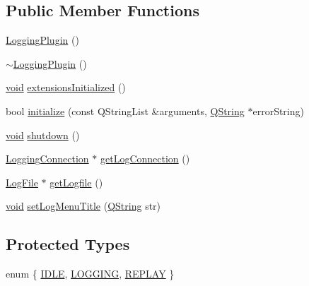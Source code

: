 \subsection*{\-Public \-Member \-Functions}
\begin{DoxyCompactItemize}
\item 
\hyperlink{group___logging_gaddeb416da42e01f34abe18fa2fa39400}{\-Logging\-Plugin} ()
\item 
\hyperlink{group___logging_gaea5e4f27d801294d19b75975ce35a567}{$\sim$\-Logging\-Plugin} ()
\item 
\hyperlink{group___u_a_v_objects_plugin_ga444cf2ff3f0ecbe028adce838d373f5c}{void} \hyperlink{group___logging_gafefd3e10b5da148d3f936cc3631e4792}{extensions\-Initialized} ()
\item 
bool \hyperlink{group___logging_ga35b6ec31ee1c4118f1b15d8fb425e013}{initialize} (const \-Q\-String\-List \&arguments, \hyperlink{group___u_a_v_objects_plugin_gab9d252f49c333c94a72f97ce3105a32d}{\-Q\-String} $\ast$error\-String)
\item 
\hyperlink{group___u_a_v_objects_plugin_ga444cf2ff3f0ecbe028adce838d373f5c}{void} \hyperlink{group___logging_ga15f368e20b8953eb38b932e59462c779}{shutdown} ()
\item 
\hyperlink{class_logging_connection}{\-Logging\-Connection} $\ast$ \hyperlink{class_logging_plugin_a50a824fc8b3afb92e4022c61c8ed0eff}{get\-Log\-Connection} ()
\item 
\hyperlink{class_log_file}{\-Log\-File} $\ast$ \hyperlink{class_logging_plugin_af36b137218e9bcf44a1c79d954a8f0b2}{get\-Logfile} ()
\item 
\hyperlink{group___u_a_v_objects_plugin_ga444cf2ff3f0ecbe028adce838d373f5c}{void} \hyperlink{class_logging_plugin_a732485aa196fa951f26f38764111938a}{set\-Log\-Menu\-Title} (\hyperlink{group___u_a_v_objects_plugin_gab9d252f49c333c94a72f97ce3105a32d}{\-Q\-String} str)
\end{DoxyCompactItemize}
\subsection*{\-Protected \-Types}
\begin{DoxyCompactItemize}
\item 
enum \{ \hyperlink{class_logging_plugin_ad8e62b5675086f87b52b9e6253d766ceab016e5df51d783046bf9e64102b4c54c}{\-I\-D\-L\-E}, 
\hyperlink{class_logging_plugin_ad8e62b5675086f87b52b9e6253d766cea8e92421dfc070a67508f0311f921c0cd}{\-L\-O\-G\-G\-I\-N\-G}, 
\hyperlink{class_logging_plugin_ad8e62b5675086f87b52b9e6253d766ceaa2f7f75dc98e5eda7bd7dbd4bf83a31b}{\-R\-E\-P\-L\-A\-Y}
 \}
\end{DoxyCompactItemize}
